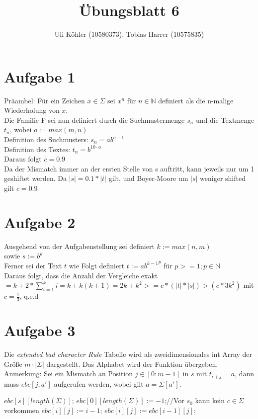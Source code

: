 \documentclass[a4paper,10pt,oneside,leqno]{scrartcl}
\title{Übungsblatt 6}
\author{Uli Köhler (10580373), Tobias Harrer (10575835)}
\begin{document}
\maketitle
\section*{Aufgabe 1}
Präambel: Für ein Zeichen $x \in \Sigma$ sei $x^n$ für $n \in \mathbb{N}$ definiert als die n-malige Wiederholung von $x$.\\
Die Familie F sei nun definiert durch die Suchmustermenge $s_n$ und die Textmenge $t_n$, wobei $o := max(m,n)$	\\
Definition des Suchmusters: $s_n = ab^{o-1}$\\
Definition des Textes: $t_n = b^{10\cdot o}$\\
Daraus folgt $c = 0.9$\\
Da der Mismatch immer an der ersten Stelle von s auftritt, kann jeweils nur um 1 geshiftet werden.
Da $|s| = 0.1*|t|$ gilt, und Boyer-Moore um $|s|$ weniger shifted gilt $c = 0.9$

\section*{Aufgabe 2}
Ausgehend von der Aufgabenstellung sei definiert $k := max(n,m)$\\
sowie $s := b^k$\\
Ferner sei der Text $t$ wie Folgt definiert $t := {ab^{k-1}}^p$ für $p >= 1; p \in \mathbb{N}$\\
Daraus folgt, dass die Anzahl der Vergleiche exakt $ = k + 2 * \sum_{i=1}^{k} i = k+k(k+1)=2k+k^2 >= c * (|t|*|s|) > (c * 3k^2) $ mit $c = \frac{1}{3}$, q.e.d


\section*{Aufgabe 3}%
Die \textit{extended bad character Rule} Tabelle wird als zweidimensionales int Array der Größe $m\cdot |\Sigma|$ dargestellt. Das
Alphabet wird der Funktion übergeben. Anmerkung: Sei ein Mismatch an Position $j\in [0:m-1]$ in $s$ mit
$t_{i+j} = a$, dann muss $ebc[j,a']$ aufgerufen werden, wobei gilt $a=\Sigma[a']$.\newline
\begin{algorithmic}
\State $ebc[s][length(\Sigma)]$;
\State $ebc[0][length(\Sigma)] := -1$;//Vor $s_0$ kann kein $c\in \Sigma$ vorkommen
      \State $ebc[i][j] := i-1$;
    \Else
      \State $ebc[i][j] := ebc[i-1][j]$;
    \EndIf
  \EndFor
\EndFor
\EndFunction
\end{algorithmic}
\end{document}
